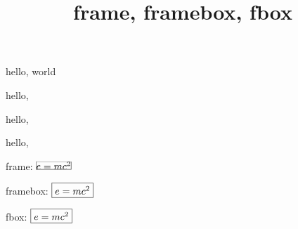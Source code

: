 \documentclass{amsart}
\title{frame, framebox, fbox}
\begin{document}
\maketitle

hello, world


hello, 

hello, 

hello, 

frame: $\frame{$e = mc^2$}$

framebox: $\framebox{$e = mc^2$}$

fbox: $\fbox{$e = mc^2$}$
\end{document}
